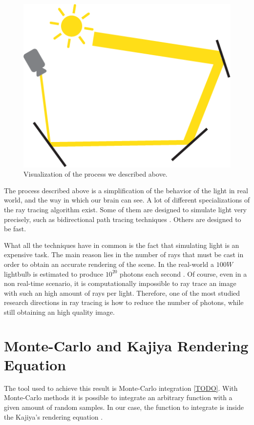 \documentclass{PoliMi_MasterThesis}
\begin{document}
\begin{figure}[H]
    \centering
    \includegraphics[width=\textwidth*\real{0.4}]{Images/ray_tracing_simple.png}
    \caption{Visualization of the process we described above.}
    \label{fig:ray_tracing_intro}
\end{figure}

The process described above is a simplification of the behavior of the light in real world, and the way in which our brain can see. A lot of different specializations of the ray tracing algorithm exist. Some of them are designed to simulate light very precisely, such as bidirectional path tracing techniques \cite{bidirectional_path_tracing}. Others are designed to be fast.

What all the techniques have in common is the fact that simulating light is an expensive task. The main reason lies in the number of rays that must be cast in order to obtain an accurate rendering of the scene. In the real-world a $100W$ lightbulb is estimated to produce $10^{20}$ photons each second \cite{monte_carlo_integration}. Of course, even in a non real-time scenario, it is computationally impossible to ray trace an image with such an high amount of rays per light. Therefore, one of the most studied research directions in ray tracing is how to reduce the number of photons, while still obtaining an high quality image.

\section*{Monte-Carlo and Kajiya Rendering Equation}
The tool used to achieve this result is Monte-Carlo integration \ref{TODO}. With Monte-Carlo methods it is possible to integrate an arbitrary function with a given amount of random samples. In our case, the function to integrate is inside the Kajiya's rendering equation \cite{rendering_equation}.
\end{document}
